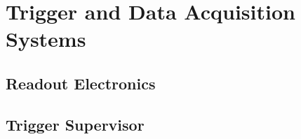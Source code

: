 \section{Trigger and Data Acquisition Systems}

\subsection{Readout Electronics}

\subsection{Trigger Supervisor}

